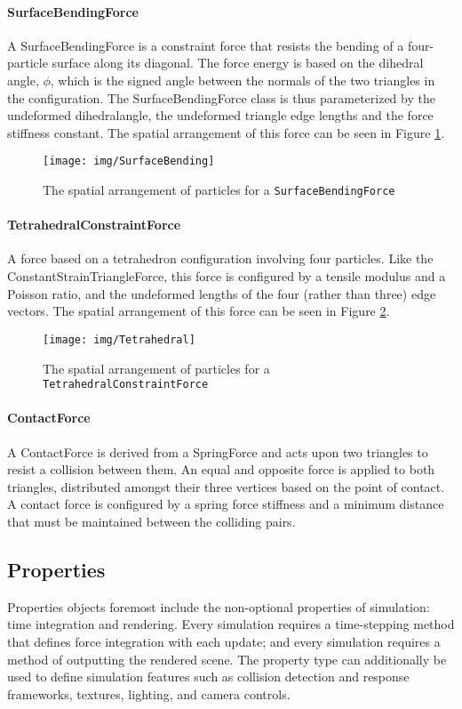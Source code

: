\documentclass[letterpaper]{article}
\newcommand\subsubsubsection[1]{\paragraph{#1}}
\begin{document}
\subsubsubsection{SurfaceBendingForce}

A SurfaceBendingForce is a constraint force that resists the bending
of a four-particle surface along its diagonal. The force energy is
based on the dihedral angle, $\phi$, which is the signed angle between
the normals of the two triangles in the configuration. The
SurfaceBendingForce class is thus parameterized by the undeformed
dihedralangle, the undeformed triangle edge lengths and the force
stiffness constant. The spatial arrangement of this force can be seen
in Figure \ref{fig:surfacef}.

\begin{figure}
  \centering
  \texttt{[image: img/SurfaceBending]}
  \caption{The spatial arrangement of particles for a \texttt{SurfaceBendingForce}}
  \label{fig:surfacef}
\end{figure}

\subsubsubsection{TetrahedralConstraintForce}

A force based on a tetrahedron configuration involving four
particles. Like the ConstantStrainTriangleForce, this force is
configured by a tensile modulus and a Poisson ratio, and the
undeformed lengths of the four (rather than three) edge vectors. The
spatial arrangement of this force can be seen in Figure
\ref{fig:tetraf}.

\begin{figure}
  \centering
  \texttt{[image: img/Tetrahedral]}
  \caption{The spatial arrangement of particles for a
    \texttt{TetrahedralConstraintForce}}
  \label{fig:tetraf}
\end{figure}

\subsubsubsection{ContactForce}

A ContactForce is derived from a SpringForce and acts upon two
triangles to resist a collision between them. An equal and opposite
force is applied to both triangles, distributed amongst their three
vertices based on the point of contact. A contact force is configured
by a spring force stiffness and a minimum distance that must be
maintained between the colliding pairs.

\subsection{Properties}
Properties objects foremost include the non-optional properties of
simulation: time integration and rendering. Every simulation requires
a time-stepping method that defines force integration with each
update; and every simulation requires a method of outputting the
rendered scene. The property type can additionally be used to define
simulation features such as collision detection and response
frameworks, textures, lighting, and camera controls.
\end{document}
